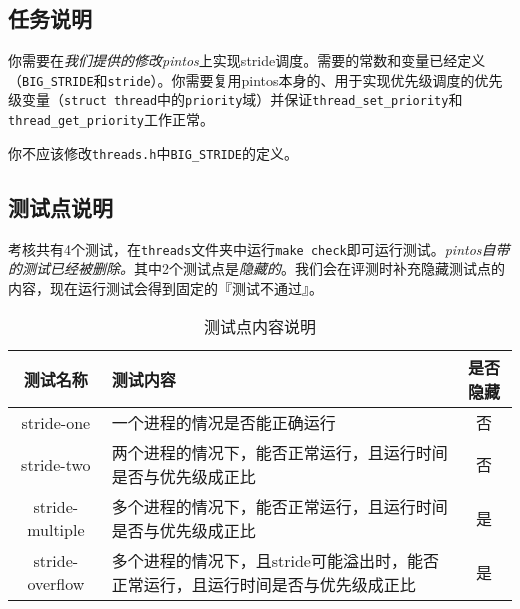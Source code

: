 \documentclass{ctexart}
\begin{document}
\subsection{任务说明}
你需要在\emph{我们提供的修改pintos}上实现stride调度。需要的常数和变量已经定义（\texttt{BIG\_STRIDE}和\texttt{stride}）。你需要复用pintos本身的、用于实现优先级调度的优先级变量（\texttt{struct thread}中的\texttt{priority}域）并保证\texttt{thread\_set\allowbreak\_priority}和\texttt{thread\_get\_priority}工作正常。

你不应该修改\texttt{threads.h}中\texttt{BIG\_STRIDE}的定义。
\subsection{测试点说明}
考核共有4个测试，在\texttt{threads}文件夹中运行\texttt{make check}即可运行测试。\emph{pintos自带的测试已经被删除。}其中2个测试点是\emph{隐藏的}。我们会在评测时补充隐藏测试点的内容，现在运行测试会得到固定的『测试不通过』。

\begin{table}[h]
    \caption{测试点内容说明}
    \centering
    \begin{tabularx}{\textwidth}{cXc} 
    \toprule
    测试名称            & 测试内容   & 是否隐藏  \\
    \midrule
    stride-one      & 一个进程的情况是否能正确运行                              & 否     \\
    stride-two      & 两个进程的情况下，能否正常运行，且运行时间是否与优先级成正比              & 否     \\
    stride-multiple & 多个进程的情况下，能否正常运行，且运行时间是否与优先级成正比              & 是     \\
    stride-overflow & 多个进程的情况下，且stride可能溢出时，能否正常运行，且运行时间是否与优先级成正比 & 是     \\
    \bottomrule
    \end{tabularx}
\end{table}
\end{document}
